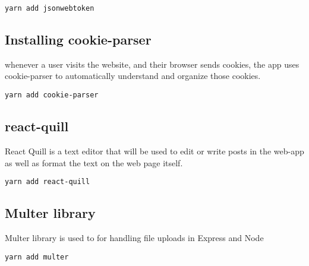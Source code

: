 \documentclass[12pt]{article}
\begin{document}
\begin{listing}[htbp]
\begin{verbatim}
yarn add jsonwebtoken
\end{verbatim}
\end{listing}



\subsection{Installing cookie-parser}
 whenever a user visits the website, and their browser sends cookies, the app uses cookie-parser to automatically understand and organize those cookies. 
 
\begin{listing}[htbp]
\begin{verbatim}
yarn add cookie-parser
\end{verbatim}
\end{listing}

\clearpage

\subsection{react-quill}

React Quill is a text editor that will be used to edit or write posts in the web-app as well as format the text on the web page itself.

\begin{listing}[htbp]
\begin{verbatim}
yarn add react-quill
\end{verbatim}
\end{listing}


\subsection{Multer library}

Multer library is used to for handling file uploads in Express and Node
 
\begin{listing}[htbp]
\begin{verbatim}
yarn add multer
\end{verbatim}
\end{listing}
\end{document}
